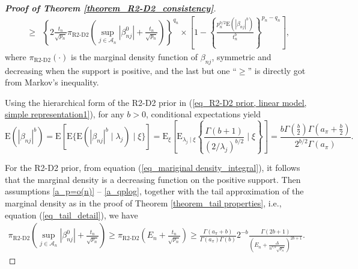 \documentclass[12pt]{article}
\begin{document}
\begin{proof} [\textbf{Proof of Theorem \ref{theorem_R2-D2_consistency}}]
{\begin{eqnarray*}
		&\geq &  \left\{  2\frac{t_n}{{\sqrt{p_n}} } \pi_{\text{R2-D2}}\left(\sup_{j\in\mathcal{A}_n}|\beta_{nj}^0| + \frac{t_n}{{\sqrt{p_n}} } \right) \right\}^{q_n} \times
		\left[ 	1-   \left\{ \frac{p_n^{b/2}   \text{E}( |\beta_{nj}|^b)}{ t_n^b} \right\}^{p_n-q_n} \right]  , \nonumber
	\end{eqnarray*}}
	where $\pi_{\text{R2-D2}}(\cdot)$ is the marginal density function of $\beta_{nj}$,   symmetric and decreasing when the support is positive, and the last but one ``$\geq$'' is directly got from Markov's inequality.


	Using the hierarchical form of the R2-D2  prior in (\ref{eq_R2-D2 prior, linear model, simple representation1}),  for any $b>0$,   conditional expectations yield
	\[
	\text{E}(|\beta_{nj}|^b) =  \text{E} [ \text{E}   \{ \text{E} (|\beta_{nj}|^b \mid \lambda_j) \mid \xi  \}]
	=  \text{E}_{\xi}  \left[ \text{E} _{\lambda_j \mid  \xi}  \left\{  \frac{\Gamma(b+1)}{({2/\lambda_j})^{b/2} }\mid \xi \right\} \right]
	= \frac{b\Gamma(\frac{b}{2})\Gamma(a_{\pi}+\frac{b}{2}) }{2^{b/2}\Gamma(a_{\pi})}  .
	\]



	For the R2-D2 prior, from equation (\ref{eq_mariginal density_integral}), it follows that the marginal density is a decreasing function on the positive support.  Then assumptions \ref{a_p=o(n)} -- \ref{a_qplog},
	together with  the tail approximation of the marginal density as in the proof of  Theorem \ref{theorem_tail properties}, i.e., equation (\ref{eq_tail_detail}), we have
	\begin{eqnarray*}
		\pi_\text{R2-D2}(\sup_{j\in\mathcal{A}_n}|\beta_{nj}^0| + \frac{t_n}{{\sqrt{p_n}} } )
		\geq \pi_\text{R2-D2}(E_n + \frac{t_n}{{\sqrt{p_n}} } )
		\geq  \frac{\Gamma(a_{\pi}+b)}{\Gamma(a_{\pi})\Gamma(b)}  2^{-b} \frac{\Gamma(2b+1)}{(E_n  + \frac{\Delta}{n^{r/2}{\sqrt{p_n}} })^{2b+1}}  .
 	\end{eqnarray*}



\end{proof}
\end{document}
